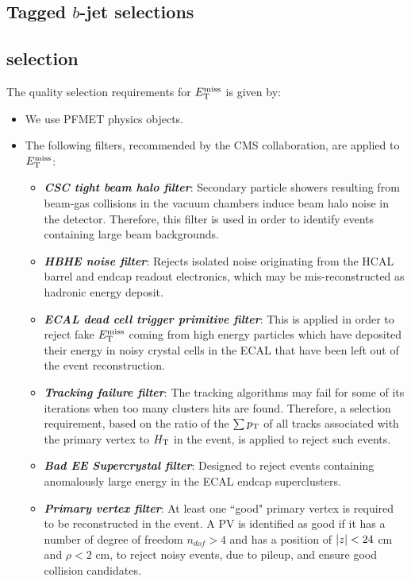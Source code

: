 \subsection{Tagged \texorpdfstring{$b$}{b}-jet selections}
\label{sec:TaggedBJetSelections}


\subsection{\texorpdfstring{\MET}{Missing transverse energy} selection}
\label{sec:METSelections}


The quality selection requirements for $E_{\mathrm{T}}^{\text{miss}}$ is given by:
\begin{itemize}
\item We use PFMET physics objects.
\item The following filters, recommended by the CMS collaboration, are 
applied to $E_{\mathrm{T}}^{\text{miss}}$:
\begin{itemize}
\item \textbf{\textit{CSC tight beam halo filter}}: Secondary particle showers resulting 
from beam-gas collisions in the vacuum chambers induce beam halo noise in the detector. 
Therefore, this filter is used in order to identify events containing large beam backgrounds. 
\item \textbf{\textit{HBHE noise filter}}: Rejects isolated noise originating from the HCAL 
barrel and endcap readout electronics, which may be mis-reconstructed as hadronic 
energy deposit.
\item \textbf{\textit{ECAL dead cell trigger primitive filter}}: This is applied in order to 
reject fake $E_{\mathrm{T}}^{\text{miss}}$ coming from high energy particles which have deposited their energy 
in noisy crystal cells in the ECAL that have been left out of the event reconstruction. 
\item \textbf{\textit{Tracking failure filter}}: The tracking algorithms may fail for some of its 
iterations when too many clusters hits are found. Therefore, a selection requirement, based 
on the ratio of the $\sum p_{\mathrm{T}}$ of all tracks associated with the primary vertex to $H_{\mathrm{T}}$ in the 
event, is applied to reject such events. 
\item \textbf{\textit{Bad EE Supercrystal filter}}: Designed to reject events containing 
anomalously large energy in the ECAL endcap superclusters. 
\item \textbf{\textit{Primary vertex filter}}: At least one ``good" primary vertex is required 
to be reconstructed in the event. A PV is identified as good if it has a number of degree of 
freedom $n_{dof} > 4$ and has a position of $\lvert z \rvert < 24$ \unit{cm} and $\rho < 2$ \unit{cm}, 
to reject noisy events, due to pileup, and ensure good collision candidates. 
\end{itemize}
\end{itemize}


